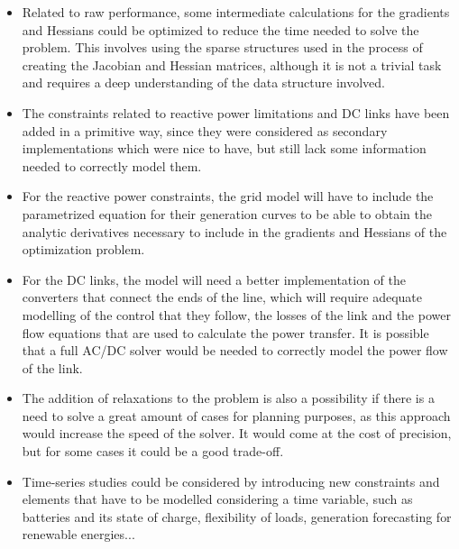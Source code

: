 \begin{itemize}
    \item Related to raw performance, some intermediate calculations for the gradients and Hessians could be optimized to reduce the time needed to solve the problem. This involves using the sparse structures 
    used in the process of creating the Jacobian and Hessian matrices, although it is not a trivial task and requires a deep understanding of the data structure involved.

    \item The constraints related to reactive power limitations and DC links have been added in a primitive way, since they were considered as secondary implementations which were nice to have, but 
    still lack some information needed to correctly model them. 

    \item For the reactive power constraints, the grid model will have to include the parametrized equation for their generation curves to be able
    to obtain the analytic derivatives necessary to include in the gradients and Hessians of the optimization problem. 

    \item For the DC links, the model will need a better implementation of the converters that connect the ends of the line, 
    which will require adequate modelling of the control that they follow, the losses of the link and the power flow equations that are used to calculate the power transfer. It is possible that a full AC/DC 
    solver would be needed to correctly model the power flow of the link.

    \item The addition of relaxations to the problem is also a possibility if there is a need to solve a great amount of cases for planning purposes, as this approach would increase the speed of the solver. It would come at the cost of precision,
    but for some cases it could be a good trade-off.

    \item Time-series studies could be considered by introducing new constraints and elements that have to be modelled considering a time variable, such as batteries and its state of charge, flexibility of 
    loads, generation forecasting for renewable energies...
\end{itemize}
